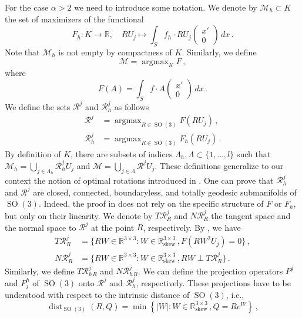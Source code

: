 \documentclass{article}
\theoremstyle{plain}
\theoremstyle{plain}
\theoremstyle{plain}
\theoremstyle{plain}
\theoremstyle{plain}
\theoremstyle{definition}
\theoremstyle{definition}
\renewcommand{\r}{\mathbb{R}}
\DeclareMathOperator{\SO}{SO}
\DeclareMathOperator{\skw}{skew}
\DeclareMathOperator{\dist}{dist}
\DeclareMathOperator*{\argmax}{argmax}
\begin{document}
For the case $\alpha >  2$ we need to introduce some notation. We denote by $\mathcal{M}_h \subset K$ the set of maximizers of the functional
\[
F_h \colon K \to \r, \quad RU_j \mapsto \int_S f_h \cdot RU_j \begin{pmatrix}
x' \\ 0
\end{pmatrix} \, dx \,.
\]
Note that $\mathcal{M}_h$ is not empty by compactness of $K$. Similarly, we define 
\[	
\mathcal{M} = \argmax_{K} F \,,
\]
where
\[
	F(A) = \int_S f \cdot A \begin{pmatrix}
	x' \\ 0
	\end{pmatrix} \, dx \,.
\]
We define the sets $\mathcal{R}^j$ and $\mathcal{R}_h^j$ as follows
\begin{align}
	\mathcal{R}^j & = \argmax_{R \in \SO(3)} F(RU_j)\,,\\
	\mathcal{R}_h^j & = \argmax_{R \in \SO(3)} F_h(RU_j)\,.
\end{align}
By definition of $K$, there are subsets of indices $\Lambda_h, \Lambda \subset \{1, \dots, l\}$ such that $\mathcal{M}_h = \bigcup_{j \in \Lambda_h} \mathcal{R}_h^jU_j$
and $\mathcal{M} = \bigcup_{j \in \Lambda} \mathcal{R}^jU_j$.
These definitions generalize to our context the notion of optimal rotations introduced in \cite{MAOR2021}. One can prove that $\mathcal{R}_h^j$ and $\mathcal{R}^j$ are closed, connected, boundaryless, and totally geodesic submanifolds of $\SO(3)$. Indeed, the proof in \cite{MAOR2021} does not rely on the specific structure of $F$ or $F_h$, but only on their linearity. We denote by $T \mathcal{R}^j_R$ and $N \mathcal{R}^j_R$ the tangent space and the normal space to $\mathcal{R}^j$ at the point $R$, respectively. By \cite[Proposition 4.1]{MAOR2021}, we have
\begin{align}
	T\mathcal{R}^j_R &= \{RW \in \r^{3 \times 3} \colon W \in \r^{3 \times 3}_{\skw}\,, F(RW^2U_j) = 0\}\,, \\
	N\mathcal{R}^j_R &= \{RW \in \r^{3 \times 3} \colon W \in \r^{3 \times 3}_{\skw}\,, RW \perp T\mathcal{R}^j_R\} \,. 
\end{align}
Similarly, we define $T \mathcal{R}_h^j{}_R$ and $N \mathcal{R}_h^j{}_R$. We can define the projection operators $P^j$ and $P_j^h$ of $\SO(3)$ onto $\mathcal{R}^j$ and $\mathcal{R}_h^j$, respectively. These projections have to be understood with respect to the intrinsic distance of $\SO(3)$, i.e.,
\[
	\dist_{\SO(3)}(R, Q) = \min\left\{|W| \colon W \in \r^{3 \times 3}_{\skw}\,, Q = Re^W\right\} \,,
\]
\end{document}
